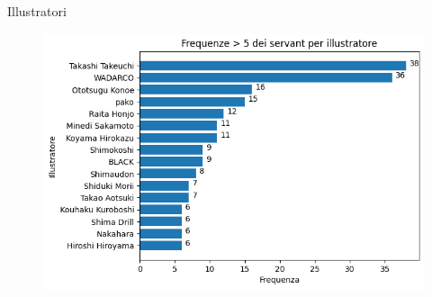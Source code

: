 \documentclass{beamer}
\begin{document}
\begin{darkframes}
  \begin{frame}{Illustratori}
    \begin{figure}
      \centering
      \includegraphics[scale=0.55]{./images/illustrators.png}
    \end{figure}
  \end{frame}


\end{darkframes}
\end{document}
